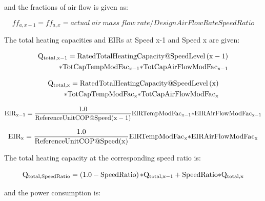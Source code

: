 and the fractions of air flow is given as:

\begin{equation}
ff_{a,x-1} = ff_{a,x} = actual~air~mass~flow~rate/DesignAirFlowRateSpeedRatio
\end{equation}

The total heating capacities and EIRs at Speed x-1 and Speed x are given:

\begin{equation}
\begin{split}
{{\rm{Q}}_{{\rm{total}},{\rm{x}} - 1}} = {\rm{RatedTotalHeatingCapacity}}@{\rm{SpeedLevel}}\left( {{\rm{x}} - 1} \right) \\
{\rm{*TotCapTempModFa}}{{\rm{c}}_{{\rm{x}} - 1}} {\rm{*TotCapAirFlowModFa}}{{\rm{c}}_{{\rm{x}} - 1}}
\end{split}
\end{equation}

\begin{equation}
\begin{split}
{{\rm{Q}}_{{\rm{total}},{\rm{x}}}} = {\rm{RatedTotalHeatingCapacity}}@{\rm{SpeedLevel}}\left( {\rm{x}} \right) \\
{\rm{*TotCapTempModFa}}{{\rm{c}}_{\rm{x}}} {\rm{*TotCapAirFlowModFa}}{{\rm{c}}_{\rm{x}}}
\end{split}
\end{equation}

\begin{equation}
{\rm{EI}}{{\rm{R}}_{{\rm{x}} - 1}} = \frac{{1.0}}{{{\rm{ReferenceUnitCOP}}@{\rm{Speed}}({\rm{x}} - 1)}}{\rm{EIRTempModFa}}{{\rm{c}}_{{\rm{x}} - 1}}{\rm{*EIRAirFlowModFa}}{{\rm{c}}_{{\rm{x}} - 1}}
\end{equation}

\begin{equation}
{\rm{EI}}{{\rm{R}}_{\rm{x}}} = \frac{{1.0}}{{{\rm{ReferenceUnitCOP}}@{\rm{Speed}}({\rm{x}})}}{\rm{EIRTempModFa}}{{\rm{c}}_{\rm{x}}}{\rm{*EIRAirFlowModFa}}{{\rm{c}}_{\rm{x}}}
\end{equation}

The total heating capacity at the corresponding speed ratio is:

\begin{equation}
{{\rm{Q}}_{{\rm{total}},{\rm{SpeedRatio}}}} = \left( {1.0 - {\rm{SpeedRatio}}} \right){\rm{*}}{{\rm{Q}}_{{\rm{total}},{\rm{x}} - 1}} + {\rm{SpeedRatio*}}{{\rm{Q}}_{{\rm{total}},{\rm{x}}}}
\end{equation}

and the power consumption is:

